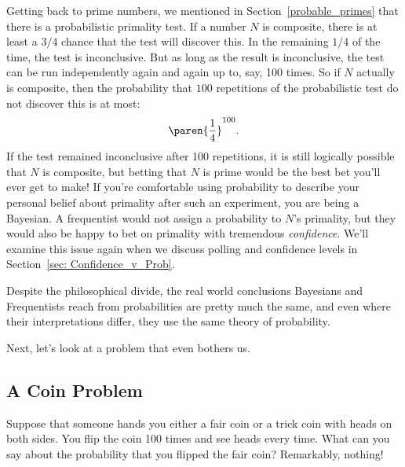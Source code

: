 Getting back to prime numbers, we mentioned in
Section~\ref{probable_primes} that there is a probabilistic primality
test.  If a number $N$ is composite, there is at least a $3/4$ chance
that the test will discover this.  In the remaining $1/4$ of the time,
the test is inconclusive.  But as long as the result is inconclusive,
the test can be run independently again and again up to, say, 100
times.  So if $N$ actually is composite, then the probability that
$100$ repetitions of the probabilistic test do not discover this is
at most:
\[
\paren{\frac{1}{4}}^{100}.
\]
If the test remained inconclusive after 100 repetitions, it is still
logically possible that $N$ is composite, but betting that $N$ is
prime would be the best bet you'll ever get to make!  If you're
comfortable using probability to describe your personal belief about
primality after such an experiment, you are being a Bayesian.  A
frequentist would not assign a probability to $N$'s primality, but
they would also be happy to bet on primality with tremendous
\emph{confidence}.  We'll examine this issue again when we discuss
polling and confidence levels in Section~\ref{sec: Confidence_v_Prob}.

Despite the philosophical divide, the real world conclusions Bayesians
and Frequentists reach from probabilities are pretty much the same,
and even where their interpretations differ, they use the same theory
of probability.

\iffalse

Next, let's look at a problem that even bothers us.

\subsection{A Coin Problem}

Suppose that someone hands you either a fair coin or a trick coin with
heads on both sides.  You flip the coin 100 times and see heads every
time.  What can you say about the probability that you flipped the
fair coin?  Remarkably, nothing!

